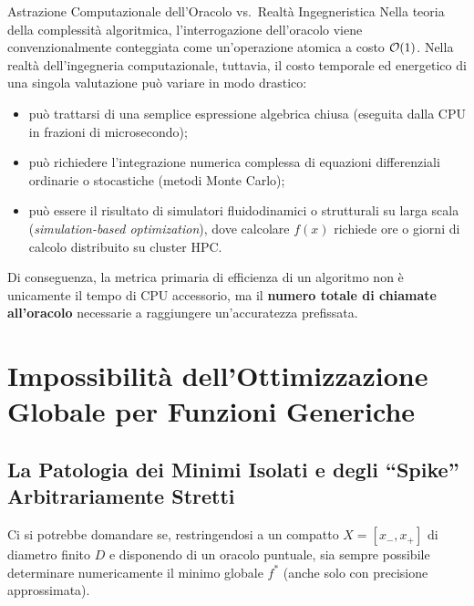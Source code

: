 \begin{noteblock}{Astrazione Computazionale dell'Oracolo vs.\ Realt\`a Ingegneristica}
Nella teoria della complessit\`a algoritmica, l'interrogazione dell'oracolo viene convenzionalmente conteggiata come un'operazione atomica a costo $\mathcal{O}\!\left(1\right)$. Nella realt\`a dell'ingegneria computazionale, tuttavia, il costo temporale ed energetico di una singola valutazione pu\`o variare in modo drastico:
\begin{itemize}
    \item pu\`o trattarsi di una semplice espressione algebrica chiusa (eseguita dalla CPU in frazioni di microsecondo);
    \item pu\`o richiedere l'integrazione numerica complessa di equazioni differenziali ordinarie o stocastiche (metodi Monte Carlo);
    \item pu\`o essere il risultato di simulatori fluidodinamici o strutturali su larga scala (\textit{simulation-based optimization}), dove calcolare $f(x)$ richiede ore o giorni di calcolo distribuito su cluster HPC.
\end{itemize}
Di conseguenza, la metrica primaria di efficienza di un algoritmo non \`e unicamente il tempo di CPU accessorio, ma il \textbf{numero totale di chiamate all'oracolo} necessarie a raggiungere un'accuratezza prefissata.
\end{noteblock}

\FloatBarrier
\section{Impossibilit\`a dell'Ottimizzazione Globale per Funzioni Generiche}
\label{sec:univariata-impossibilita-globale}

\subsection{La Patologia dei Minimi Isolati e degli ``Spike'' Arbitrariamente Stretti}
Ci si potrebbe domandare se, restringendosi a un compatto $X = [x_-, x_+]$ di diametro finito $D$ e disponendo di un oracolo puntuale, sia sempre possibile determinare numericamente il minimo globale $f^*$ (anche solo con precisione approssimata). 

